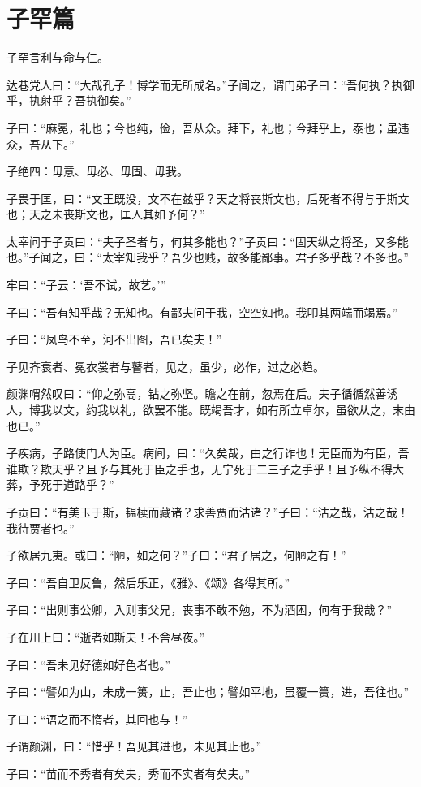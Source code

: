 \documentclass[12pt,a4paper]{ctexbook}
\begin{document}
\section{子罕篇}
子罕言利与命与仁。\par
达巷党人曰：“大哉孔子！博学而无所成名。”子闻之，谓门弟子曰：“吾何执？执御乎，执射乎？吾执御矣。”\par
子曰：“麻冕，礼也；今也纯，俭，吾从众。拜下，礼也；今拜乎上，泰也；虽违众，吾从下。”\par
子绝四：毋意、毋必、毋固、毋我。\par
子畏于匡，曰：“文王既没，文不在兹乎？天之将丧斯文也，后死者不得与于斯文也；天之未丧斯文也，匡人其如予何？”\par
太宰问于子贡曰：“夫子圣者与，何其多能也？”子贡曰：“固天纵之将圣，又多能也。”子闻之，曰：“太宰知我乎？吾少也贱，故多能鄙事。君子多乎哉？不多也。”\par
牢曰：“子云：‘吾不试，故艺。’”\par
子曰：“吾有知乎哉？无知也。有鄙夫问于我，空空如也。我叩其两端而竭焉。”\par
子曰：“凤鸟不至，河不出图，吾已矣夫！”\par
子见齐衰者、冕衣裳者与瞽者，见之，虽少，必作，过之必趋。\par
颜渊喟然叹曰：“仰之弥高，钻之弥坚。瞻之在前，忽焉在后。夫子循循然善诱人，博我以文，约我以礼，欲罢不能。既竭吾才，如有所立卓尔，虽欲从之，末由也已。”\par
子疾病，子路使门人为臣。病间，曰：“久矣哉，由之行诈也！无臣而为有臣，吾谁欺？欺天乎？且予与其死于臣之手也，无宁死于二三子之手乎！且予纵不得大葬，予死于道路乎？”\par
子贡曰：“有美玉于斯，韫椟而藏诸？求善贾而沽诸？”子曰：“沽之哉，沽之哉！我待贾者也。”\par
子欲居九夷。或曰：“陋，如之何？”子曰：“君子居之，何陋之有！”\par
子曰：“吾自卫反鲁，然后乐正，《雅》、《颂》各得其所。”\par
子曰：“出则事公卿，入则事父兄，丧事不敢不勉，不为酒困，何有于我哉？”\par
子在川上曰：“逝者如斯夫！不舍昼夜。”\par
子曰：“吾未见好德如好色者也。”\par
子曰：“譬如为山，未成一篑，止，吾止也；譬如平地，虽覆一篑，进，吾往也。”\par
子曰：“语之而不惰者，其回也与！”\par
子谓颜渊，曰：“惜乎！吾见其进也，未见其止也。”\par
子曰：“苗而不秀者有矣夫，秀而不实者有矣夫。”\par
\end{document}
